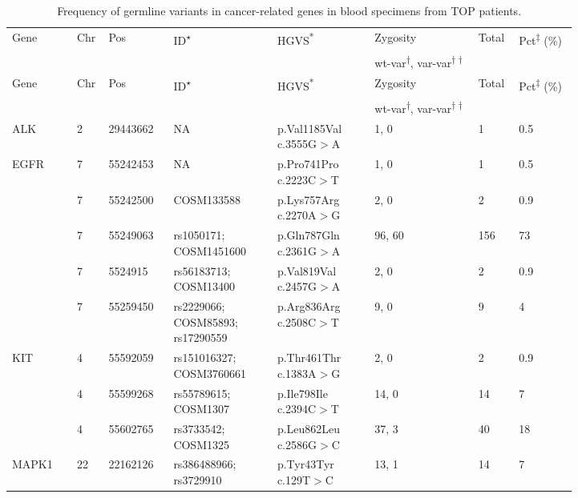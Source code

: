 
\newpage
\begin{longtable}{p{0.1\linewidth}|p{0.02\linewidth}p{0.1\linewidth}p{0.16\linewidth}p{0.15\linewidth}p{0.16\linewidth}p{0.04\linewidth}p{0.09\linewidth}}
\caption{Frequency of germline variants in cancer-related genes in blood specimens from TOP patients.}
\label{tbl:freq_cancer_genes}
    \\
    \hline
    Gene & Chr & Pos & ID\textsuperscript{$\star$} & HGVS\textsuperscript{*} & Zygosity & Total & Pct\textsuperscript{$\ddagger$} (\%)
		\\
		&
    \multicolumn{4}{l}{}
		&
		\multicolumn{1}{l}{wt-var\textsuperscript{$\dagger$}, var-var\textsuperscript{$\dagger\dagger$}}
		&
		\multicolumn{2}{l}{}
		\\
    \hline
    \endfirsthead
    \hline
    Gene & Chr & Pos & ID\textsuperscript{$\star$} & HGVS\textsuperscript{*} & Zygosity & Total & Pct\textsuperscript{$\ddagger$} (\%)
		\\
		&
    \multicolumn{4}{l}{}
		&
		\multicolumn{1}{l}{wt-var\textsuperscript{$\dagger$}, var-var\textsuperscript{$\dagger\dagger$}}
		&
		\multicolumn{2}{l}{}
		\\
    \hline
    \endhead
		ALK & 2 & 29443662 & NA & p.Val1185Val c.3555G$>$A & 1, 0 & 1 & 0.5
		\\
		\hline
		EGFR & 7 & 55242453 & NA & p.Pro741Pro c.2223C$>$T & 1, 0 & 1 & 0.5
		\\
		& 7 & 55242500 & COSM133588 & p.Lys757Arg c.2270A$>$G & 2, 0 & 2 & 0.9
		\\
		& 7 & 55249063 & rs1050171; COSM1451600 & p.Gln787Gln c.2361G$>$A & 96, 60 & 156 & 73
		\\
		& 7 & 5524915 & rs56183713; COSM13400 & p.Val819Val c.2457G$>$A & 2, 0 & 2 & 0.9
		\\
		& 7 & 55259450 & rs2229066; COSM85893; rs17290559 & p.Arg836Arg c.2508C$>$T & 9, 0 & 9 & 4
		\\
    \hline
		KIT & 4 & 55592059 & rs151016327; COSM3760661 & p.Thr461Thr c.1383A$>$G & 2, 0 & 2 & 0.9
		\\
		& 4 & 55599268 & rs55789615; COSM1307 & p.Ile798Ile c.2394C$>$T & 14, 0 & 14 & 7
		\\
		& 4 & 55602765 & rs3733542; COSM1325 & p.Leu862Leu c.2586G$>$C & 37, 3 & 40 & 18
		\\
		\hline
		MAPK1 & 22 & 22162126 & rs386488966; rs3729910 & p.Tyr43Tyr c.129T$>$C & 13, 1 & 14 & 7

\end{longtable}
